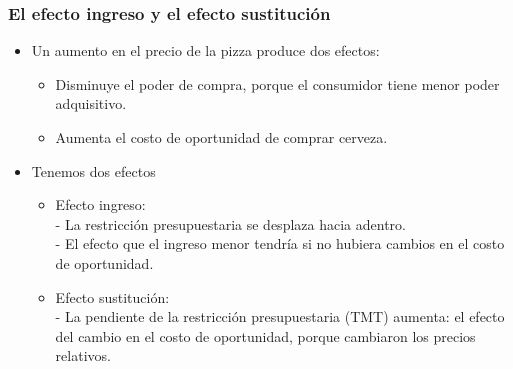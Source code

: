 \documentclass{beamer}
\begin{document}
\begin{frame}
\frametitle{El efecto ingreso y el efecto sustitución}
\begin{itemize}
    \item Un aumento en el precio de la pizza produce dos efectos:
    \begin{itemize}
        \item Disminuye el poder de compra, porque el consumidor tiene menor poder adquisitivo.
        \item Aumenta el costo de oportunidad de comprar cerveza.
    \end{itemize}
    \item Tenemos dos efectos
    \begin{itemize}
    \item Efecto ingreso: \\
    - La restricción presupuestaria se desplaza hacia adentro. \\
    - El efecto que el ingreso menor tendría si no hubiera cambios en el costo de oportunidad.
    \item Efecto sustitución: \\
    - La pendiente de la restricción presupuestaria (TMT) aumenta: el efecto del cambio en el costo de oportunidad, porque cambiaron los precios relativos.
    \end{itemize}
\end{itemize} 
\end{frame}

\end{document}
